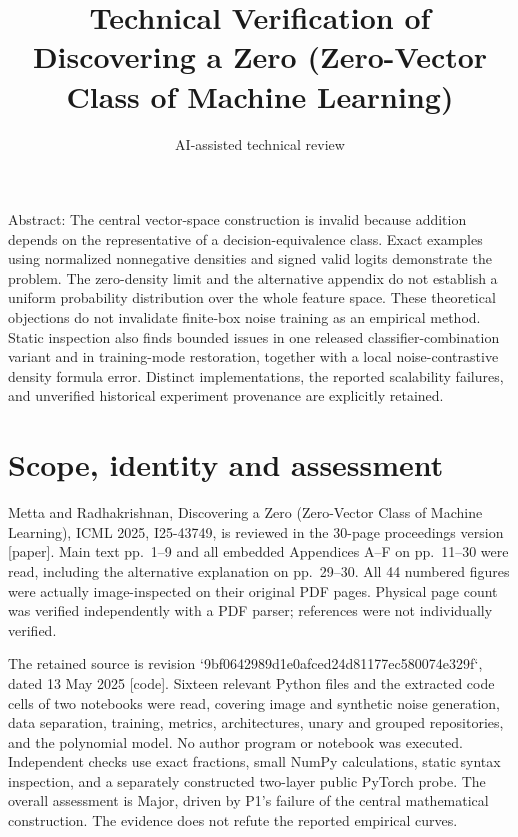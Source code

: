 \documentclass[10pt]{article}
\title{Technical Verification of
Discovering a Zero (Zero-Vector Class of Machine Learning)}
\author{AI-assisted technical review}
\date{}
\begin{document}
\maketitle
Abstract: The central vector-space construction is invalid because addition depends on the representative of a decision-equivalence class. Exact examples using normalized nonnegative densities and signed valid logits demonstrate the problem. The zero-density limit and the alternative appendix do not establish a uniform probability distribution over the whole feature space. These theoretical objections do not invalidate finite-box noise training as an empirical method. Static inspection also finds bounded issues in one released classifier-combination variant and in training-mode restoration, together with a local noise-contrastive density formula error. Distinct implementations, the reported scalability failures, and unverified historical experiment provenance are explicitly retained.\par
\section*{Scope, identity and assessment}
Metta and Radhakrishnan, Discovering a Zero (Zero-Vector Class of Machine Learning), ICML 2025, I25-43749, is reviewed in the 30-page proceedings version [paper]. Main text pp. 1–9 and all embedded Appendices A–F on pp. 11–30 were read, including the alternative explanation on pp. 29–30. All 44 numbered figures were actually image-inspected on their original PDF pages. Physical page count was verified independently with a PDF parser; references were not individually verified.\par
The retained source is revision `9bf0642989d1e0afced24d81177ec580074e329f`, dated 13 May 2025 [code]. Sixteen relevant Python files and the extracted code cells of two notebooks were read, covering image and synthetic noise generation, data separation, training, metrics, architectures, unary and grouped repositories, and the polynomial model. No author program or notebook was executed. Independent checks use exact fractions, small NumPy calculations, static syntax inspection, and a separately constructed two-layer public PyTorch probe. The overall assessment is Major, driven by P1’s failure of the central mathematical construction. The evidence does not refute the reported empirical curves.\par
\end{document}
